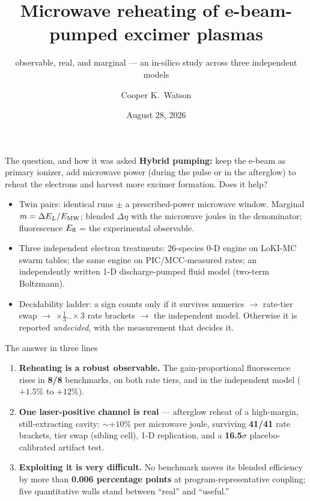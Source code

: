 \documentclass[aspectratio=169,10pt]{beamer}
\title{Microwave reheating of e-beam-pumped excimer plasmas}
\subtitle{observable, real, and marginal --- an in-silico study across
three independent models}
\author{Cooper K.\ Watson}
\institute{Texas A\&M University \\[1ex]
{\tiny Internal draft --- program data-rights review before wider
circulation. All numbers regenerate from recorded run artifacts.}}
\date{August 28, 2026}
\newcommand{\good}[1]{\textcolor{okgreen}{#1}}
\newcommand{\bad}[1]{\textcolor{badred}{#1}}
\begin{document}
\maketitle

\begin{frame}{The question, and how it was asked}
\textbf{Hybrid pumping:} keep the e-beam as primary ionizer, add
microwave power (during the pulse or in the afterglow) to reheat the
electrons and harvest more excimer formation. Does it help?
\vspace{1ex}
\begin{itemize}
  \item \alert{Twin pairs}: identical runs $\pm$ a prescribed-power
        microwave window. Marginal $m=\Delta E_L/E_{\rm MW}$; blended
        $\Delta\eta$ with the microwave joules in the denominator;
        fluorescence $E_{\rm fl}$ = the experimental observable.
  \item \alert{Three independent electron treatments}: 26-species 0-D
        engine on LoKI-MC swarm tables; the same engine on
        PIC/MCC-measured rates; an independently written 1-D
        discharge-pumped fluid model (two-term Boltzmann).
  \item \alert{Decidability ladder}: a sign counts only if it survives
        numerics $\to$ rate-tier swap $\to$ $\times\frac13..\times3$
        rate brackets $\to$ the independent model. Otherwise it is
        reported \emph{undecided}, with the measurement that decides it.
\end{itemize}
\end{frame}

\begin{frame}{The answer in three lines}
\begin{enumerate}
  \item \good{\textbf{Reheating is a robust observable.}} The
        gain-proportional fluorescence rises in \textbf{8/8}
        benchmarks, on both rate tiers, and in the independent model
        ($+1.5\%$ to $+12\%$).
  \item \good{\textbf{One laser-positive channel is real}} --- afterglow
        reheat of a high-margin, still-extracting cavity:
        ${\sim}+10\%$ per microwave joule, surviving \textbf{41/41}
        rate brackets, tier swap (sibling cell), 1-D replication, and
        a \textbf{16.5$\sigma$} placebo-calibrated artifact test.
  \item \bad{\textbf{Exploiting it is very difficult.}} No benchmark
        moves its blended efficiency by more than
        \textbf{0.006 percentage points} at program-representative
        coupling; five quantitative walls stand between ``real'' and
        ``useful.''
\end{enumerate}
\end{frame}
\end{document}
